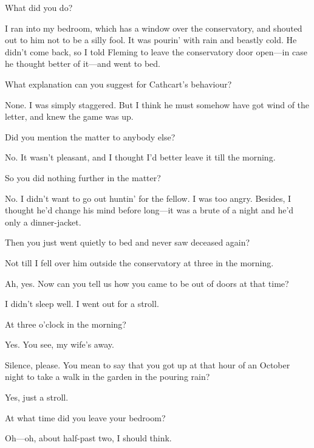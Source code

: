 \begin{dialogue}
 What did you do?

 I ran into my bedroom, which has a window over the conservatory, and shouted out to him not to be a silly fool. It was pourin' with rain and beastly cold. He didn't come back, so I told Fleming to leave the conservatory door open—in case he thought better of it—and went to bed.

 What explanation can you suggest for Cathcart's behaviour?

 None. I was simply staggered. But I think he must somehow have got wind of the letter, and knew the game was up.

 Did you mention the matter to anybody else?

 No. It wasn't pleasant, and I thought I'd better leave it till the morning.

 So you did nothing further in the matter?

 No. I didn't want to go out huntin' for the fellow. I was too angry. Besides, I thought he'd change his mind before long—it was a brute of a night and he'd only a dinner-jacket.

 Then you just went quietly to bed and never saw deceased again?

 Not till I fell over him outside the conservatory at three in the morning.

 Ah, yes. Now can you tell us how you came to be out of doors at that time?

  I didn't sleep well. I went out for a stroll.

 At three o'clock in the morning?

 Yes.  You see, my wife's away. 

 Silence, please\textellipsis . You mean to say that you got up at that hour of an October night to take a walk in the garden in the pouring rain?

 Yes, just a stroll. 

 At what time did you leave your bedroom?

 Oh—oh, about half-past two, I should think.


\end{dialogue}
